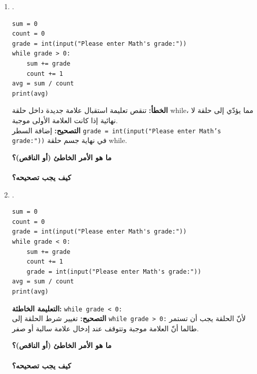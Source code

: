 \documentclass[14pt]{extarticle}
\begin{document}
\begin{enumerate}[label=\textbf{تمرين \arabic*:}, wide=0pt, itemsep=2.2em]
\begin{enumerate}[label=\textbf{مقطع \alph*:}, wide=0pt, itemsep=1.5em]
\item .
\begin{boxCode}
\begin{english}
\begin{verbatim}
sum = 0
count = 0
grade = int(input("Please enter Math's grade:"))
while grade > 0:
    sum += grade
    count += 1
avg = sum / count
print(avg)
\end{verbatim}
\end{english}
\end{boxCode}
\ifwithsols
\begin{boxSolution}
\textbf{الخطأ:} تنقص تعليمة استقبال علامة جديدة داخل حلقة \textenglish{while}، مما يؤدّي إلى حلقة لا نهائية إذا كانت العلامة الأولى موجبة. \\
\textbf{التصحيح:} إضافة السطر \textenglish{\texttt{grade = int(input("Please enter Math's grade:"))}} في نهاية جسم حلقة \textenglish{while}.
\end{boxSolution}
\else
\vspace{0.5cm}
\textbf{ما هو الأمر الخاطئ (أو الناقص)؟} \hrulefill \\
 \\
\textbf{كيف يجب تصحيحه؟} \hrulefill
\fi
\filbreak

\item .
\begin{boxCode}
\begin{english}
\begin{verbatim}
sum = 0
count = 0
grade = int(input("Please enter Math's grade:"))
while grade < 0:
    sum += grade
    count += 1
    grade = int(input("Please enter Math's grade:"))
avg = sum / count
print(avg)
\end{verbatim}
\end{english}
\end{boxCode}
\ifwithsols
\begin{boxSolution}
\textbf{التعليمة الخاطئة:} \textenglish{\texttt{while grade < 0:}} \\
\textbf{التصحيح:} تغيير شرط الحلقة إلى \textenglish{\texttt{while grade > 0:}} لأنّ الحلقة يجب أن تستمر طالما أنّ العلامة موجبة وتتوقف عند إدخال علامة سالبة أو صفر.
\end{boxSolution}
\else
\vspace{0.5cm}
\textbf{ما هو الأمر الخاطئ (أو الناقص)؟} \hrulefill \\
 \\
\textbf{كيف يجب تصحيحه؟} \hrulefill
\fi
\filbreak


\end{enumerate}
\end{enumerate}
\end{document}
